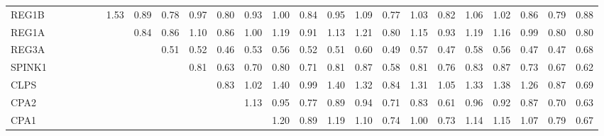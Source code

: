 \begin{longtable}{lrrrrrrrrrrrrrrrrrrrrrrr}
REG1B    &              &              &              &             &             &        1.53 &        0.89 &         0.78 &       0.97 &       0.80 &       0.93 &        1.00 &      0.84 &        0.95 &           1.09 &      0.77 &          1.03 &      0.82 &        1.06 &        1.02 &       0.86 &        0.79 &        0.88 \\
REG1A    &              &              &              &             &             &             &        0.84 &         0.86 &       1.10 &       0.86 &       1.00 &        1.19 &      0.91 &        1.13 &           1.21 &      0.80 &          1.15 &      0.93 &        1.19 &        1.16 &       0.99 &        0.80 &        0.80 \\
REG3A    &              &              &              &             &             &             &             &         0.51 &       0.52 &       0.46 &       0.53 &        0.56 &      0.52 &        0.51 &           0.60 &      0.49 &          0.57 &      0.47 &        0.58 &        0.56 &       0.47 &        0.47 &        0.68 \\
SPINK1   &              &              &              &             &             &             &             &              &       0.81 &       0.63 &       0.70 &        0.80 &      0.71 &        0.81 &           0.87 &      0.58 &          0.81 &      0.76 &        0.83 &        0.87 &       0.73 &        0.67 &        0.62 \\
CLPS     &              &              &              &             &             &             &             &              &            &       0.83 &       1.02 &        1.40 &      0.99 &        1.40 &           1.32 &      0.84 &          1.31 &      1.05 &        1.33 &        1.38 &       1.26 &        0.87 &        0.69 \\
CPA2     &              &              &              &             &             &             &             &              &            &            &       1.13 &        0.95 &      0.77 &        0.89 &           0.94 &      0.71 &          0.83 &      0.61 &        0.96 &        0.92 &       0.87 &        0.70 &        0.63 \\
CPA1     &              &              &              &             &             &             &             &              &            &            &            &        1.20 &      0.89 &        1.19 &           1.10 &      0.74 &          1.00 &      0.73 &        1.14 &        1.15 &       1.07 &        0.79 &        0.67 \\

\end{longtable}
